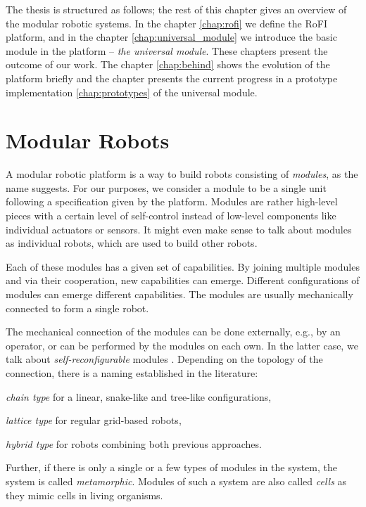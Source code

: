 The thesis is structured as follows; the rest of this chapter gives an overview
of the modular robotic systems. In the chapter \ref{chap:rofi} we define the
RoFI platform, and in the chapter \ref{chap:universal_module} we introduce the
basic module in the platform -- \emph{the universal module}. These chapters
present the outcome of our work. The chapter \ref{chap:behind} shows  the
evolution of the platform briefly and the chapter presents the current progress
in a prototype implementation \ref{chap:prototypes} of the universal module.

\section{Modular Robots}

A modular robotic platform is a way to build robots consisting of
\emph{modules}, as the name suggests. For our purposes, we consider a module to
be a single unit following a specification given by the platform. Modules are
rather high-level pieces with a certain level of self-control instead of
low-level components like individual actuators or sensors. It might even make
sense to talk about modules as individual robots, which are used to build other
robots\cite{brunete_current_2017}.

Each of these modules has a given set of capabilities. By joining multiple
modules and via their cooperation, new capabilities can emerge. Different
configurations of modules can emerge different capabilities. The modules are
usually mechanically connected to form a single robot.

The mechanical connection of the modules can be done externally, e.g., by an
operator, or can be performed by the modules on each own. In the latter case, we
talk about \emph{self-reconfigurable} modules \cite{brunete_current_2017}.
Depending on the topology of the connection, there is a naming established in
the literature\cite{brunete_current_2017}:
\begin{enumerate*}
    \item \emph{chain type} for a linear, snake-like and tree-like
    configurations,
    \item \emph{lattice type} for regular grid-based robots,
    \item \emph{hybrid type} for robots combining both previous approaches.
\end{enumerate*}
Further, if there is only a single or a few types of modules in the system, the
system is called \emph{metamorphic}\cite{brunete_current_2017}. Modules of such
a system are also called \emph{cells} as they mimic cells in living organisms.

